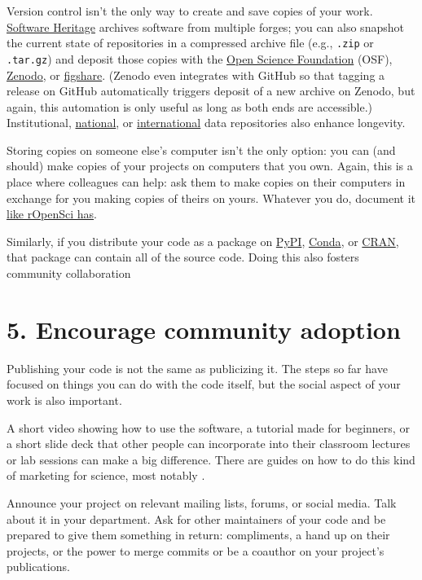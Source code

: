 \documentclass[10pt,letterpaper]{article}
\begin{document}
Version control isn't the only way to create and save copies of your work.
\href{https://www.softwareheritage.org/how-to-archive-reference-code/}{Software Heritage} archives software from multiple forges;
you can also snapshot the current state of repositories in a compressed archive file
(e.g., \texttt{.zip} or \texttt{.tar.gz})
and deposit those copies with the \href{https://osf.io/}{Open Science Foundation} (OSF),
\href{https://zenodo.org/}{Zenodo},
or \href{https://figshare.com/}{figshare}.
(Zenodo even integrates with GitHub so that tagging a release on GitHub
automatically triggers deposit of a new archive on Zenodo,
but again,
this automation is only useful as long as both ends are accessible.)
Institutional,
\href{https://amt.coretrustseal.org/certificates/}{national},
or \href{https://safeguar.de/}{international} data repositories also enhance longevity.

Storing copies on someone else's computer isn't the only option:
you can (and should) make copies of your projects on computers that you own.
Again,
this is a place where colleagues can help:
ask them to make copies on their computers in exchange for you making copies of theirs on yours.
Whatever you do,
document it \href{https://ropensci.org/blog/2022/03/22/safeguards-and-backups-for-github-organizations/}{like rOpenSci has}.

Similarly,
if you distribute your code as a package on \href{https://pypi.org/}{PyPI},
\href{https://anaconda.org/anaconda/conda}{Conda},
or \href{https://cran.r-project.org/}{CRAN},
that package can contain all of the source code.
Doing this also fosters community collaboration

\section*{5. Encourage community adoption}

Publishing your code is not the same as publicizing it.
The steps so far have focused on things you can do with the code itself,
but the social aspect of your work is also important.

A short video showing how to use the software,
a tutorial made for beginners,
or a short slide deck that other people can incorporate into their classroom lectures or lab sessions
can make a big difference.
There are guides on how to do this kind of marketing for science,
most notably \cite{Kuchner2011}.

Announce your project on relevant mailing lists, forums, or social media.
Talk about it in your department.
Ask for other maintainers of your code
and be prepared to give them something in return:
compliments,
a hand up on their projects,
or the power to merge commits or be a coauthor on your project's publications.
\end{document}

